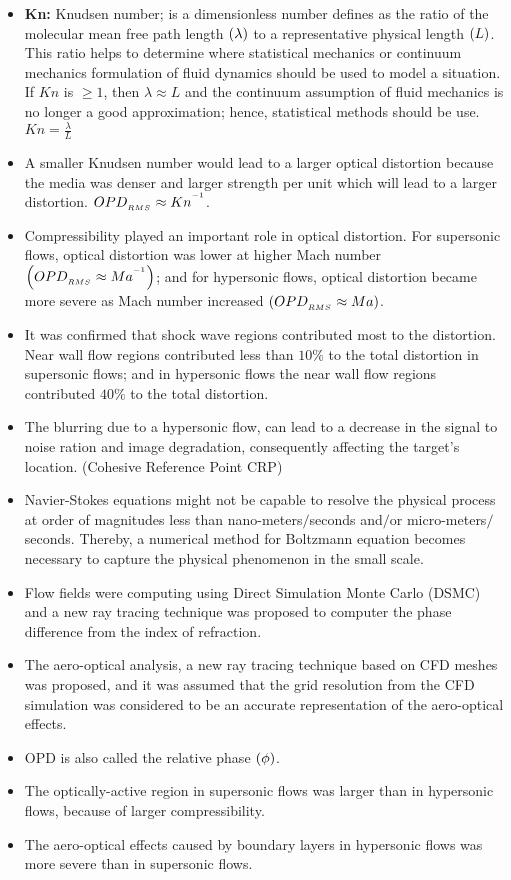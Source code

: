         \begin{itemize} 
            \item \textbf{Kn:} Knudsen number; is a dimensionless number defines as the ratio of the molecular mean free path length $\left(\lambda\right)$ to a representative physical length $\left(L\right)$. This ratio helps to determine where statistical mechanics or continuum mechanics formulation of fluid dynamics should be used to model a situation. If $Kn$ is $\geq 1$, then $\lambda \approx L$ and the continuum assumption of fluid mechanics is no longer a good approximation; hence, statistical methods should be use. $Kn = \frac{\lambda}{L}$
            \item A smaller Knudsen number would lead to a larger optical distortion because the media was denser and larger strength per unit which will lead to a larger distortion. $OPD_{_{RMS}} \approx Kn^{^{-1}}$.
            \item Compressibility played an important role in optical distortion. For supersonic flows, optical distortion was lower at higher Mach number $\left(OPD_{_{RMS}}\approx Ma^{^{-1}}\right)$; and for hypersonic flows, optical distortion became more severe as Mach number increased $\left(OPD_{_{RMS}}\approx Ma\right)$.
            \item It was confirmed that shock wave regions contributed most to the distortion. Near wall flow regions contributed less than $10\%$ to the total distortion in supersonic flows; and in hypersonic flows the near wall flow regions contributed $40\%$ to the total distortion. 
            \item The blurring due to a hypersonic flow, can lead to a decrease in the signal to noise ration and image degradation, consequently affecting the target's location. (Cohesive Reference Point CRP)     
            \item Navier-Stokes equations might not be capable to resolve the physical process at order of magnitudes less than nano-meters$/$seconds and$/$or micro-meters$/$seconds. Thereby, a numerical method for Boltzmann equation becomes necessary to capture the physical phenomenon in the small scale. 
            \item Flow fields were computing using Direct Simulation Monte Carlo (DSMC) and a new ray tracing technique was proposed to computer the phase difference from the index of refraction.  
            \item The aero-optical analysis, a new ray tracing technique based on CFD meshes was proposed, and it was assumed that the grid resolution from the CFD simulation was considered to be an accurate representation of the aero-optical effects. 
            \item OPD is also called the relative phase $\left(\phi\right)$.  
            \item The optically-active region in supersonic flows was larger than in hypersonic flows, because of larger compressibility.  
            \item The aero-optical effects caused by boundary layers in hypersonic flows was more severe than in supersonic flows. 
        \end{itemize}

\fi

\newpage
\printbibliography[title=Bibliography]

